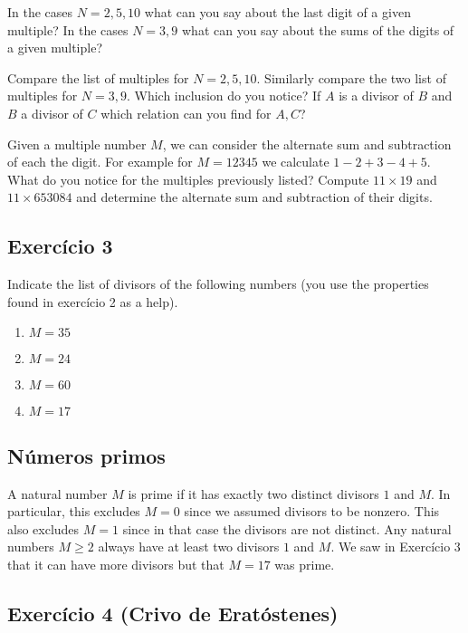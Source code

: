 In the cases $N=2,5,10$ what can you say about the last digit of a given
multiple? In the cases $N=3,9$ what can you say about the sums of the digits of
a given multiple?

Compare the list of multiples for $N=2,5,10$. Similarly compare the two list
of multiples for $N=3,9$. Which inclusion do you notice? If $A$ is a divisor of
$B$ and $B$ a divisor of $C$ which relation can you find for $A,C$?

Given a multiple number $M$, we can consider the alternate
sum and subtraction of each the digit. For example for $M=12345$ we calculate
$1-2+3-4+5$. What do you notice for the multiples previously listed?
Compute $11 \times 19$ and $11 \times 653084$ and determine the alternate
sum and subtraction of their digits.

\subsection*{Exercício 3}

Indicate the list of divisors of the following numbers (you use the
properties found in exercício 2 as a help).

\begin{enumerate}
\item $M=35$
\item $M=24$
\item $M=60$
\item $M=17$
\end{enumerate}

\subsection*{Números primos}

A natural number $M$ is prime if it has exactly two distinct divisors
$1$ and $M$. In particular, this excludes $M=0$ since we assumed divisors
to be nonzero. This also excludes $M=1$ since in that case the divisors
are not distinct. Any natural numbers $M \geq 2$ always have at least two
divisors $1$ and $M$. We saw in Exercício 3 that it can have more divisors
but that $M=17$ was prime.

\subsection*{Exercício 4 (Crivo de Eratóstenes)}

